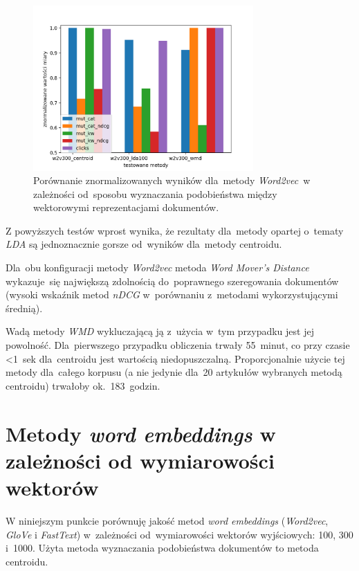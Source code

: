 \documentclass[pl]{minipw} %
\begin{document}
\begin{figure}[H]
	\centering
	\includegraphics[width=0.75\textwidth]{img/results/w2v300_centroid_w2v300_lda100_w2v300_wmd_.png}
	\caption{Porównanie znormalizowanych wyników dla~metody \textit{Word2vec}~w zależności od~sposobu wyznaczania podobieństwa między wektorowymi reprezentacjami dokumentów.}
\end{figure}

Z powyższych testów wprost wynika, że rezultaty dla~metody opartej o~tematy \textit{LDA} są jednoznacznie gorsze od~wyników dla~metody centroidu.

Dla~obu konfiguracji metody \textit{Word2vec} metoda \textit{Word Mover's Distance} wykazuje~się największą zdolnością do~poprawnego szeregowania dokumentów (wysoki wskaźnik metod \textit{nDCG} w~porównaniu z~metodami wykorzystującymi średnią).

Wadą metody \textit{WMD} wykluczającą ją z~użycia w~tym przypadku jest jej powolność. Dla~pierwszego przypadku  obliczenia trwały 55~minut, co przy czasie <1~sek dla~centroidu jest wartością niedopuszczalną. Proporcjonalnie użycie tej metody dla~całego korpusu (a nie jedynie dla~20 artykułów wybranych metodą centroidu) trwałoby ok.~183~godzin.


\section{Metody \textit{word embeddings} w zależności od wymiarowości wektorów}

W niniejszym punkcie porównuję jakość metod \textit{word embeddings} (\textit{Word2vec}, \textit{GloVe} i \textit{FastText}) w~zależności od~wymiarowości wektorów wyjściowych: 100, 300 i~1000. Użyta metoda wyznaczania podobieństwa dokumentów to metoda centroidu.
\end{document}
